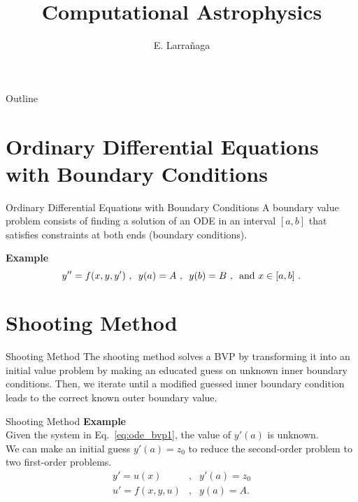 \documentclass[11pt]{beamer}
\begin{document}
\begin{frame}
\title{Computational Astrophysics}
\author{E. Larrañaga}
\titlepage
\end{frame}

\begin{frame}{Outline}
\tableofcontents
\end{frame}

\section{Ordinary Differential Equations with Boundary Conditions}
\begin{frame}[fragile]{Ordinary Differential Equations with Boundary Conditions}
A boundary
value problem consists of finding a solution of an ODE
in an interval $[a,b]$ that satisfies constraints at both
ends (boundary conditions).

\textbf{Example}
\begin{equation}
y'' = f(x,y,y')\,\,, 
\hspace{0.5em} y(a) = A\,\,,
\hspace{0.5em} y(b) = B\,\,, 
\hspace{0.5em} \text{and } x \in [a,b]\,\,.
\label{eq:ode_bvp1}
\end{equation}
\end{frame}


\section{Shooting Method}
\begin{frame}[fragile]{Shooting Method}
The shooting method solves a BVP  by transforming it into an initial value problem by
making an educated guess on unknown inner boundary conditions. Then, we iterate
 until a modified guessed inner boundary condition leads to
the correct known outer boundary value.
\end{frame}

\begin{frame}[fragile]{Shooting Method}
\textbf{Example}\\
 
Given the system in Eq.~\ref{eq:ode_bvp1}, the value of $y'(a)$ is
unknown.\\

We can make an initial guess $y'(a) = z_0$ to reduce
the second-order problem to two first-order problems.
\begin{eqnarray}
y' = u(x) &,& y'(a) = z_0\\
u' = f(x,y,u) &,& y(a) = A.
\end{eqnarray}


\end{frame}
\end{document}
